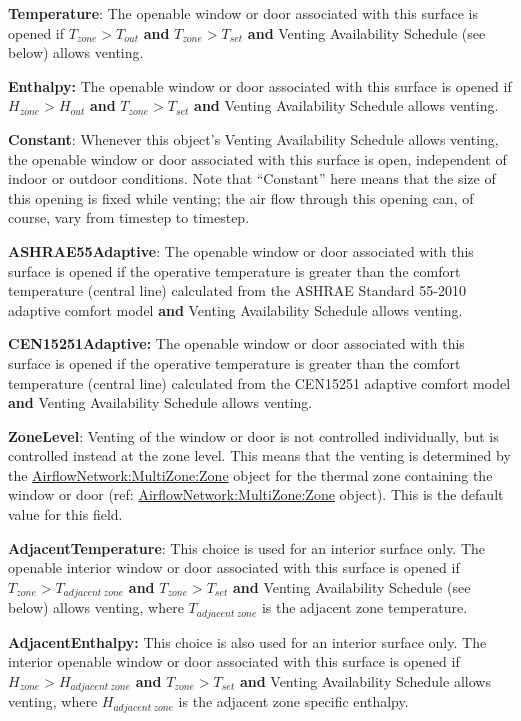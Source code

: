 \textbf{Temperature}: The openable window or door associated with this surface
is opened if $T_{zone} > T_{out}$ \textbf{and} $T_{zone} > T_{set}$ \textbf{and}
Venting Availability Schedule (see below) allows venting.

\textbf{Enthalpy:} The openable window or door associated with this surface is
opened if $H_{zone} > H_{out}$ \textbf{and} $T_{zone} > T_{set}$ \textbf{and}
Venting Availability Schedule allows venting.

\textbf{Constant}: Whenever this object's Venting Availability Schedule allows venting, the openable window or door associated with this surface is open, independent of indoor or outdoor conditions. Note that ``Constant'' here means that the size of this opening is fixed while venting; the air flow through this opening can, of course, vary from timestep to timestep.

\textbf{ASHRAE55Adaptive}: The openable window or door associated with this surface is opened if the operative temperature is greater than the comfort temperature (central line) calculated from the ASHRAE Standard 55-2010 adaptive comfort model \textbf{and} Venting Availability Schedule allows venting.

\textbf{CEN15251Adaptive:} The openable window or door associated with this surface is opened if the operative temperature is greater than the comfort temperature (central line) calculated from the CEN15251 adaptive comfort model \textbf{and} Venting Availability Schedule allows venting.

\textbf{ZoneLevel}: Venting of the window or door is not controlled individually, but is controlled instead at the zone level. This means that the venting is determined by the \hyperref[airflownetworkmultizonezone]{AirflowNetwork:MultiZone:Zone} object for the thermal zone containing the window or door (ref: \hyperref[airflownetworkmultizonezone]{AirflowNetwork:MultiZone:Zone} object). This is the default value for this field.

\textbf{AdjacentTemperature}: This choice is used for an interior surface only.
The openable interior window or door associated with this surface is opened if
$T_{zone} > T_{adjacent\ zone}$ \textbf{and} $T_{zone} > T_{set}$ \textbf{and}
Venting Availability Schedule (see below) allows venting, where $T_{adjacent\ zone}$
is the adjacent zone temperature.

\textbf{AdjacentEnthalpy:} This choice is also used for an interior surface only.
The interior openable window or door associated with this surface is opened if
$H_{zone} > H_{adjacent\ zone}$ \textbf{and} $T_{zone} > T_{set}$ \textbf{and}
Venting Availability Schedule allows venting, where $H_{adjacent\ zone}$ is the
adjacent zone specific enthalpy.

